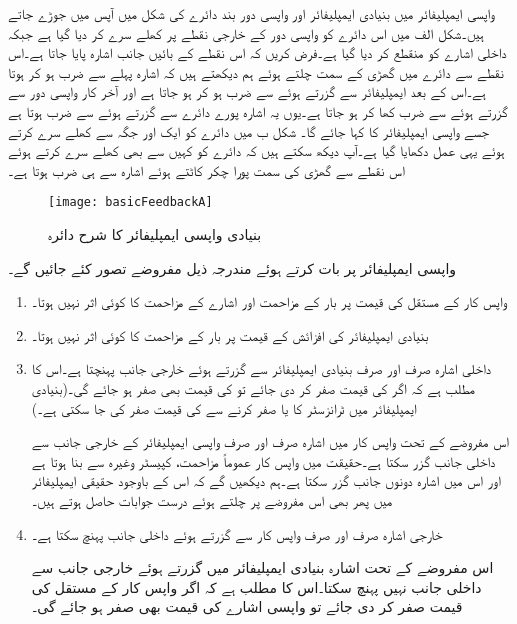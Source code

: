 واپسی ایمپلیفائر میں بنیادی ایمپلیفائر اور واپسی دور بند دائرے کی شکل میں آپس میں جوڑے جاتے ہیں۔شکل  الف میں اس دائرے کو واپسی دور کے خارجی نقطے   پر کھلے سرے کر دیا گیا ہے جبکہ داخلی اشارے کو منقطع کر دیا گیا ہے۔فرض کریں کہ اس نقطے  کے بائیں جانب اشارہ  پایا جاتا ہے۔اس نقطے  سے دائرے میں گھڑی کے سمت چلتے ہوئے ہم دیکھتے ہیں کہ اشارہ  پہلے  سے ضرب ہو کر  ہوتا ہے۔اس کے بعد ایمپلیفائر سے گزرتے ہوئے  سے ضرب ہو کر  ہو جاتا ہے اور آخر کار واپسی دور سے گزرتے ہوئے  سے ضرب کھا کر  ہو جاتا ہے۔یوں یہ اشارہ پورے دائرے سے گزرتے ہوئے  سے ضرب ہوتا ہے جسے واپسی ایمپلیفائر کا  کہا جائے گا۔ شکل  ب میں دائرے کو ایک اور جگہ سے کھلے سرے کرتے ہوئے یہی عمل دکھایا گیا ہے۔آپ دیکھ سکتے ہیں کہ دائرے کو کہیں سے بھی کھلے سرے کرتے ہوئے اس نقطے  سے گھڑی کی سمت پورا چکر کاٹتے ہوئے اشارہ  سے ہی ضرب ہوتا ہے۔
\begin{figure}
\centering
\texttt{[image: basicFeedbackA]}
\caption{بنیادی واپسی ایمپلیفائر کا شرح دائرہ}
\label{شکل_بنیادی_واپسی_ایمپلیفائر_شرح_دائرہ}
\end{figure}

واپسی ایمپلیفائر پر بات کرتے ہوئے مندرجہ ذیل مفروضے  تصور کئے جائیں گے۔

\begin{enumerate}

\item
واپس کار کے مستقل  کی قیمت پر بار کے مزاحمت  اور اشارے کے مزاحمت  کا کوئی اثر نہیں ہوتا۔
\item
بنیادی ایمپلیفائر کی افزائش  کے قیمت پر بار کے مزاحمت  کا کوئی اثر نہیں ہوتا۔
\item
داخلی اشارہ صرف اور صرف بنیادی ایمپلیفائر سے گزرتے ہوئے خارجی جانب پہنچتا ہے۔اس کا مطلب ہے کہ اگر  کی قیمت صفر کر دی جائے تو  کی قیمت بھی صفر ہو جائے گی۔(بنیادی ایمپلیفائر میں ٹرانزسٹر کا  یا  صفر کرنے سے   کی قیمت صفر کی جا سکتی ہے۔)

اس مفروضے کے تحت واپس کار میں اشارہ صرف اور صرف واپسی ایمپلیفائر کے خارجی جانب سے داخلی جانب گزر سکتا ہے۔حقیقت میں واپس کار عموماً مزاحمت، کپیسٹر وغیرہ سے بنا ہوتا ہے اور اس میں اشارہ دونوں جانب گزر سکتا ہے۔ہم دیکھیں گے کہ اس کے باوجود حقیقی ایمپلیفائر میں پھر بھی اس مفروضے پر چلتے ہوئے درست جوابات حاصل ہوتے ہیں۔
\item
خارجی اشارہ صرف اور صرف واپس کار سے گزرتے ہوئے داخلی جانب پہنچ سکتا ہے۔

اس مفروضے کے تحت اشارہ بنیادی ایمپلیفائر میں گزرتے ہوئے خارجی جانب سے داخلی جانب نہیں پہنچ سکتا۔اس کا مطلب ہے کہ اگر واپس کار کے مستقل  کی  قیمت صفر کر دی جائے تو واپسی اشارے کی قیمت بھی صفر ہو جائے گی۔
\end{enumerate}

